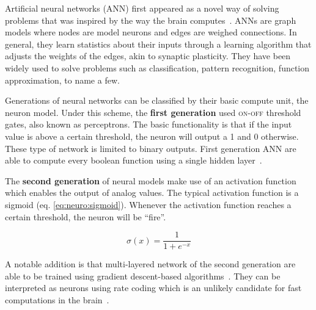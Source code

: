 Artificial neural networks (ANN) first appeared as a novel way of solving problems that was inspired by the way the brain computes~\cite{mcculloch1943logical}. ANNs are graph models where nodes are model neurons and edges are weighed connections. In general, they learn statistics about their inputs through a learning algorithm that adjusts the weights of the edges, akin to synaptic plasticity. They have been widely used to solve problems such as classification, pattern recognition, function approximation, to name a few.

Generations of neural networks can be classified by their basic compute unit, the neuron model. Under this scheme, the \textbf{first generation} used \textsc{on-off} threshold gates, also known as perceptrons. The basic functionality is that if the input value is above a certain threshold, the neuron will output a 1 and 0 otherwise. These type of network is limited to binary outputs. First generation ANN are able to compute every boolean function using a single hidden layer~\cite{third-gen-nn-Maass1997}.

The \textbf{second generation} of neural models make use of an activation function which enables the output of analog values. The typical activation function is a sigmoid (eq. \ref{eq:neuro:sigmoid}). Whenever the activation function reaches a certain threshold, the neuron will be ``fire''.

\begin{equation}
  \sigma(x) = \frac{1}{1 + e^{-x}}
  \label{eq:neuro:sigmoid}
\end{equation}
\vspace*{0.1cm}

A notable addition is that multi-layered network of the second generation are able to be trained using gradient descent-based algorithms~\cite{hecht1989-backprop-theory}. They can be interpreted as neurons using rate coding which is an unlikely candidate for fast computations in the brain~\cite{third-gen-nn-Maass1997}.

